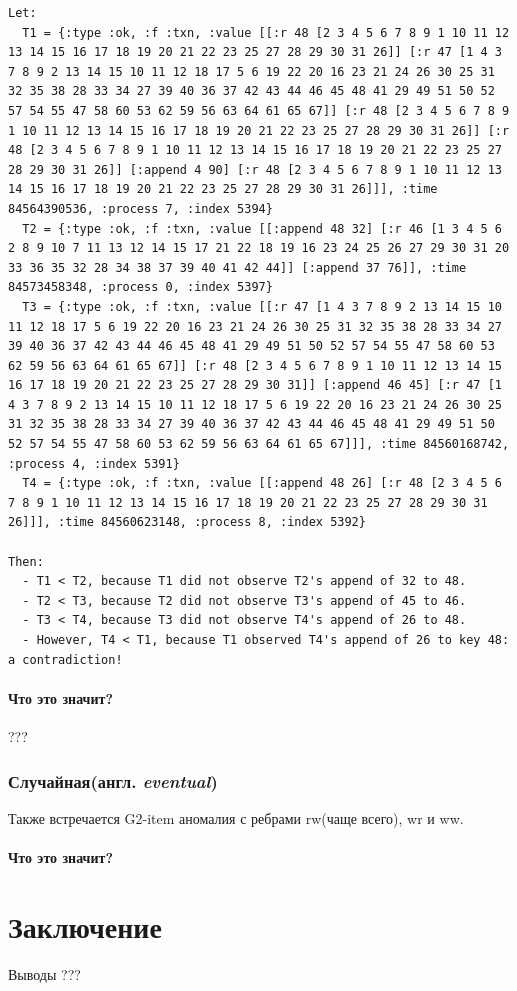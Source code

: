 \documentclass[12pt,  openany]{book}
\begin{document}
\begin{lstlisting}[caption={Пояснение к G2-item аномалии (сгенерировано Elle)}]
Let:
  T1 = {:type :ok, :f :txn, :value [[:r 48 [2 3 4 5 6 7 8 9 1 10 11 12 13 14 15 16 17 18 19 20 21 22 23 25 27 28 29 30 31 26]] [:r 47 [1 4 3 7 8 9 2 13 14 15 10 11 12 18 17 5 6 19 22 20 16 23 21 24 26 30 25 31 32 35 38 28 33 34 27 39 40 36 37 42 43 44 46 45 48 41 29 49 51 50 52 57 54 55 47 58 60 53 62 59 56 63 64 61 65 67]] [:r 48 [2 3 4 5 6 7 8 9 1 10 11 12 13 14 15 16 17 18 19 20 21 22 23 25 27 28 29 30 31 26]] [:r 48 [2 3 4 5 6 7 8 9 1 10 11 12 13 14 15 16 17 18 19 20 21 22 23 25 27 28 29 30 31 26]] [:append 4 90] [:r 48 [2 3 4 5 6 7 8 9 1 10 11 12 13 14 15 16 17 18 19 20 21 22 23 25 27 28 29 30 31 26]]], :time 84564390536, :process 7, :index 5394}
  T2 = {:type :ok, :f :txn, :value [[:append 48 32] [:r 46 [1 3 4 5 6 2 8 9 10 7 11 13 12 14 15 17 21 22 18 19 16 23 24 25 26 27 29 30 31 20 33 36 35 32 28 34 38 37 39 40 41 42 44]] [:append 37 76]], :time 84573458348, :process 0, :index 5397}
  T3 = {:type :ok, :f :txn, :value [[:r 47 [1 4 3 7 8 9 2 13 14 15 10 11 12 18 17 5 6 19 22 20 16 23 21 24 26 30 25 31 32 35 38 28 33 34 27 39 40 36 37 42 43 44 46 45 48 41 29 49 51 50 52 57 54 55 47 58 60 53 62 59 56 63 64 61 65 67]] [:r 48 [2 3 4 5 6 7 8 9 1 10 11 12 13 14 15 16 17 18 19 20 21 22 23 25 27 28 29 30 31]] [:append 46 45] [:r 47 [1 4 3 7 8 9 2 13 14 15 10 11 12 18 17 5 6 19 22 20 16 23 21 24 26 30 25 31 32 35 38 28 33 34 27 39 40 36 37 42 43 44 46 45 48 41 29 49 51 50 52 57 54 55 47 58 60 53 62 59 56 63 64 61 65 67]]], :time 84560168742, :process 4, :index 5391}
  T4 = {:type :ok, :f :txn, :value [[:append 48 26] [:r 48 [2 3 4 5 6 7 8 9 1 10 11 12 13 14 15 16 17 18 19 20 21 22 23 25 27 28 29 30 31 26]]], :time 84560623148, :process 8, :index 5392}

Then:
  - T1 < T2, because T1 did not observe T2's append of 32 to 48.
  - T2 < T3, because T2 did not observe T3's append of 45 to 46.
  - T3 < T4, because T3 did not observe T4's append of 26 to 48.
  - However, T4 < T1, because T1 observed T4's append of 26 to key 48: a contradiction!
\end{lstlisting}
\subsubsection{Что это значит?}
???

\subsection{Случайная(англ.  \textit{eventual})}
Также встречается G2-item аномалия с ребрами rw(чаще всего), wr и ww.
\subsubsection{Что это значит?}

\chapter{Заключение}
Выводы
???


\end{document}
